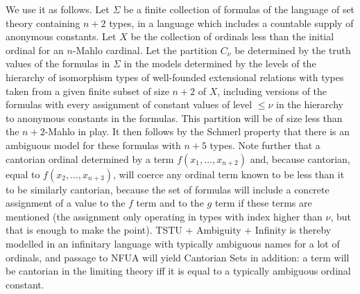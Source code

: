 \documentclass{slides}
\begin{document}
\begin{slide}

We use it as follows.  Let $\Sigma$ be a finite collection of formulas of the language of set theory containing $n+2$ types, in a language which includes a countable supply of anonymous constants.  Let $X$ be the collection of ordinals less than the initial ordinal
for an $n$-Mahlo cardinal.  Let the partition $C_\nu$ be determined by the truth values of the formulas in $\Sigma$  in the models determined by the levels of the hierarchy of isomorphism types of well-founded extensional relations
with types taken from a given finite subset of size $n+2$ of $X$, including  versions of the formulas with every assignment of  constant values of level $\leq \nu$ in the hierarchy to anonymous constants in the formulas. This partition will be of size less than the $n+2$-Mahlo in play.  It then follows by the
Schmerl property that there is an ambiguous model for these formulas with $n+5$ types.  Note further that a cantorian ordinal determined by a term $f(x_1,\ldots,x_{n+2})$ and, because cantorian, equal to $f(x_2,\ldots,x_{n+3})$, will coerce any
ordinal term known to be less than it to be similarly cantorian, because the set of formulas will  include a concrete assignment of a value to the $f$ term and to the $g$ term if these terms are mentioned (the assignment only operating in types with index higher than $\nu$, but that is enough to make the point).  TSTU + Ambiguity + Infinity  is thereby modelled in an infinitary language with typically ambiguous names for a lot of ordinals, and passage to NFUA will yield Cantorian Sets in addition:  a term will be cantorian in the limiting theory iff it is equal to a typically ambiguous ordinal constant.




\end{slide}
\end{document}
